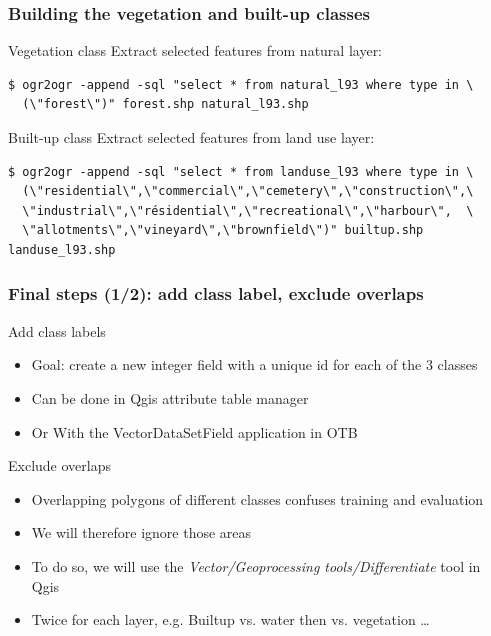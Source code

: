 \documentclass[8pt]{beamer}
\begin{document}
\begin{frame}[fragile]
\frametitle{Building the vegetation and built-up classes}
\begin{block}{Vegetation class}
Extract selected features from natural layer:
\begin{scriptsize}
\begin{verbatim}
$ ogr2ogr -append -sql "select * from natural_l93 where type in \
  (\"forest\")" forest.shp natural_l93.shp
\end{verbatim}
\end{scriptsize}
\end{block}

\begin{block}{Built-up class}
Extract selected features from land use layer:
\begin{scriptsize}
\begin{verbatim}
$ ogr2ogr -append -sql "select * from landuse_l93 where type in \
  (\"residential\",\"commercial\",\"cemetery\",\"construction\",\
  \"industrial\",\"résidential\",\"recreational\",\"harbour\",  \
  \"allotments\",\"vineyard\",\"brownfield\")" builtup.shp landuse_l93.shp
\end{verbatim}
\end{scriptsize}
\end{block}
\end{frame}

\begin{frame}[fragile]
\frametitle{Final steps (1/2): add class label, exclude overlaps}

\begin{block}{Add class labels}
\begin{itemize}
\item Goal: create a new integer field with a unique id for each of the 3 classes
\item Can be done in Qgis attribute table manager
\item Or With the VectorDataSetField application in OTB
\end{itemize}
\end{block}

\begin{block}{Exclude overlaps}
\begin{itemize}
\item Overlapping polygons of different classes confuses training and evaluation
\item We will therefore ignore those areas
\item To do so, we will use the \textit{Vector/Geoprocessing tools/Differentiate} tool in Qgis
\item Twice for each layer, e.g. Builtup vs. water then vs. vegetation \ldots
\end{itemize}
\end{block}
\end{frame}
\end{document}
